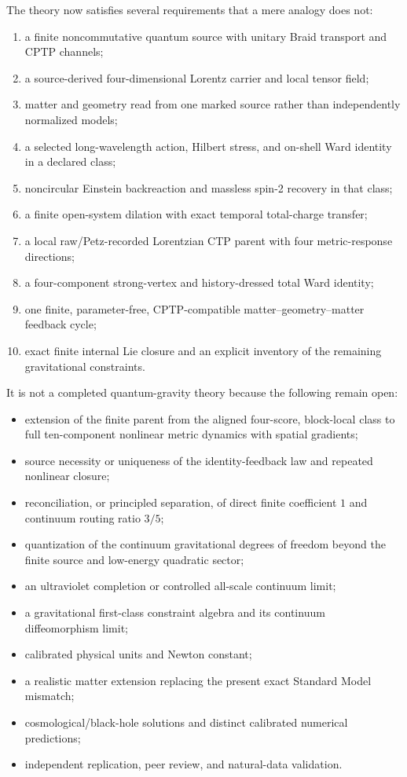 \documentclass[11pt]{article}
\theoremstyle{definition}
\theoremstyle{remark}
\begin{document}
The theory now satisfies several requirements that a mere analogy does not:
\begin{enumerate}
\item a finite noncommutative quantum source with unitary Braid transport and CPTP channels;
\item a source-derived four-dimensional Lorentz carrier and local tensor field;
\item matter and geometry read from one marked source rather than independently normalized models;
\item a selected long-wavelength action, Hilbert stress, and on-shell Ward identity in a declared class;
\item noncircular Einstein backreaction and massless spin-2 recovery in that class;
\item a finite open-system dilation with exact temporal total-charge transfer;
\item a local raw/Petz-recorded Lorentzian CTP parent with four metric-response directions;
\item a four-component strong-vertex and history-dressed total Ward identity;
\item one finite, parameter-free, CPTP-compatible matter--geometry--matter feedback cycle;
\item exact finite internal Lie closure and an explicit inventory of the remaining gravitational constraints.
\end{enumerate}

It is not a completed quantum-gravity theory because the following remain open:
\begin{itemize}
\item extension of the finite parent from the aligned four-score, block-local class to full ten-component nonlinear metric dynamics with spatial gradients;
\item source necessity or uniqueness of the identity-feedback law and repeated nonlinear closure;
\item reconciliation, or principled separation, of direct finite coefficient $1$ and continuum routing ratio $3/5$;
\item quantization of the continuum gravitational degrees of freedom beyond the finite source and low-energy quadratic sector;
\item an ultraviolet completion or controlled all-scale continuum limit;
\item a gravitational first-class constraint algebra and its continuum diffeomorphism limit;
\item calibrated physical units and Newton constant;
\item a realistic matter extension replacing the present exact Standard Model mismatch;
\item cosmological/black-hole solutions and distinct calibrated numerical predictions;
\item independent replication, peer review, and natural-data validation.
\end{itemize}
\end{document}
